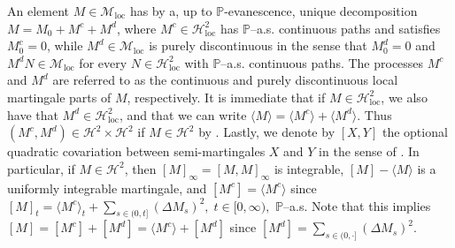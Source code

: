 \documentclass[10pt]{article} %
\newcommand\cH{\mathcal H}
\newcommand\cM{\mathcal M}
\def \P{\mathbb{P}}
\newcommand{\1}{\mathbf{1}}
\begin{document}
\medskip
An element $M \in \cM_\mathrm{loc}$ has by \cite[Theorem I.4.18]{jacod2003limit} a, up to $\P$-evanescence, unique decomposition $M = M_0 + M^c +M^d$, where $M^c \in \cH^2_\mathrm{loc}$ has $\P$--a.s. continuous paths and satisfies $M^c_0 = 0$, while $M^d \in \cM_\mathrm{loc}$ is purely discontinuous in the sense that $M^d_0 = 0$ and $M^d N \in \cM_\mathrm{loc}$ for every $N \in \cH^2_\mathrm{loc}$ with $\P$--a.s. continuous paths. The processes $M^c$ and $M^d$ are referred to as the continuous and purely discontinuous local martingale parts of $M$, respectively. It is immediate that if $M \in \cH^2_\mathrm{loc}$, we also have that $M^d \in \cH^2_\mathrm{loc}$, and that we can write $\langle M \rangle = \langle M^c \rangle + \langle M^d \rangle$. Thus $(M^c,M^d) \in \cH^2 \times\cH^2$ if $M \in \cH^2$ by \cite[Th\'eor\`eme 2.34]{jacod1979calcul}. Lastly, we denote by $[X,Y]$ the optional quadratic covariation between semi-martingales $X$ and $Y$ in the sense of \cite[Definition I.4.45]{jacod2003limit}. In particular, if $M \in \cH^2$, then $[M]_\infty = [M,M]_\infty$ is integrable, $[M] - \langle M \rangle$ is a uniformly integrable martingale, and $[M^c] = \langle M^c \rangle$ since $[M]_t = \langle M^c \rangle_t + \sum_{s \in (0,t]} (\Delta M_s)^2, \; t \in [0,\infty),$ $\P$--a.s. Note that this implies $[M] = [M^c] + [M^d] = \langle M^c \rangle + [M^d]$ since $[M^d] = \sum_{s \in (0,\cdot]}(\Delta M_s)^2$.
\end{document}
